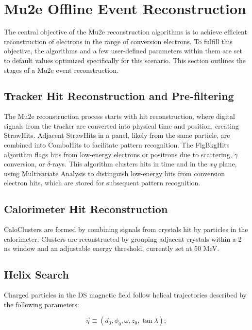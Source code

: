 
\chapter{Mu2e Offline Event Reconstruction}\label{trackreco}

The central objective of the Mu2e reconstruction algorithms is to achieve efficient 
reconstruction of electrons in the range of conversion electrons. To fulfill this objective, 
the algorithms and a few user-defined parameters within them are set to default values optimized 
specifically for this scenario. This section outlines the stages of a Mu2e event reconstruction.

\section{Tracker Hit Reconstruction and Pre-filtering}

The Mu2e reconstruction process starts with hit reconstruction, where digital signals from the 
tracker are converted into physical time and position, creating StrawHits. Adjacent StrawHits in 
a panel, likely from the same particle, are combined into ComboHits to facilitate pattern recognition. 
The FlgBkgHits algorithm flags hits from low-energy electrons or positrons due to scattering, $\gamma$ 
conversion, or $\delta$-rays. This algorithm clusters hits in time and in the $xy$ plane, using 
Multivariate Analysis to distinguish low-energy hits from conversion electron hits, which are stored for subsequent pattern recognition.

\section{Calorimeter Hit Reconstruction}

CaloClusters are formed by combining signals from crystals hit by particles 
in the calorimeter. Clusters are reconstructed by grouping adjacent crystals 
within a 2 ns window and an adjustable energy threshold, currently set at 50 MeV.

\section{Helix Search}

Charged particles in the DS magnetic field follow helical trajectories described 
by the following parameters:

\[
\vec{\eta} \equiv (d_0, \phi_0, \omega, z_0, \tan \lambda);
\]

